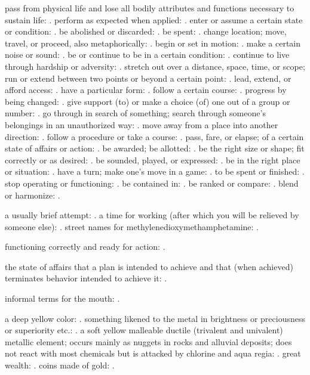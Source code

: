   pass from physical life and lose all bodily attributes and functions necessary to sustain life: . perform as expected when applied: . enter or assume a certain state or condition: . be abolished or discarded: . be spent: . change location; move, travel, or proceed, also metaphorically: . begin or set in motion: . make a certain noise or sound: . be or continue to be in a certain condition: . continue to live through hardship or adversity: . stretch out over a distance, space, time, or scope; run or extend between two points or beyond a certain point: . lead, extend, or afford access: . have a particular form: . follow a certain course: . progress by being changed: . give support (to) or make a choice (of) one out of a group or number: . go through in search of something; search through someone's belongings in an unauthorized way: . move away from a place into another direction: . follow a procedure or take a course: . pass, fare, or elapse; of a certain state of affairs or action: . be awarded; be allotted: . be the right size or shape; fit correctly or as desired: . be sounded, played, or expressed: . be in the right place or situation: . have a turn; make one's move in a game: . to be spent or finished: . stop operating or functioning: . be contained in: . be ranked or compare: . blend or harmonize: .

  a usually brief attempt: . a time for working (after which you will be relieved by someone else): . street names for methylenedioxymethamphetamine: .

  functioning correctly and ready for action: .

  the state of affairs that a plan is intended to achieve and that (when achieved) terminates behavior intended to achieve it: .

  informal terms for the mouth: .

  a deep yellow color: . something likened to the metal in brightness or preciousness or superiority etc.: . a soft yellow malleable ductile (trivalent and univalent) metallic element; occurs mainly as nuggets in rocks and alluvial deposits; does not react with most chemicals but is attacked by chlorine and aqua regia: . great wealth: . coins made of gold: .

